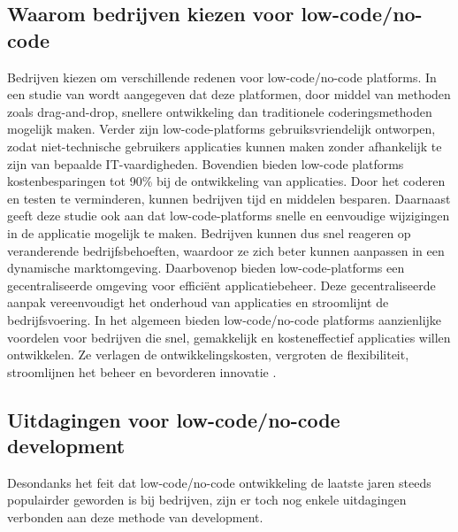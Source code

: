 \subsection{Waarom bedrijven kiezen voor low-code/no-code}
\label{subsec:waarom_low-code}

Bedrijven kiezen om verschillende redenen voor low-code/no-code platforms. In een studie van \textcite{Yan2021} wordt aangegeven dat deze platformen, door middel van methoden zoals drag-and-drop, snellere ontwikkeling dan traditionele coderingsmethoden mogelijk maken. Verder zijn low-code-platforms gebruiksvriendelijk ontworpen, zodat niet-technische gebruikers applicaties kunnen maken zonder afhankelijk te zijn van bepaalde IT-vaardigheden. Bovendien bieden low-code platforms kostenbesparingen tot 90\% bij de ontwikkeling van applicaties. Door het coderen en testen te verminderen, kunnen bedrijven tijd en middelen besparen. Daarnaast geeft deze studie ook aan dat low-code-platforms snelle en eenvoudige wijzigingen in de applicatie mogelijk te maken. Bedrijven kunnen dus snel reageren op veranderende bedrijfsbehoeften, waardoor ze zich beter kunnen aanpassen in een dynamische marktomgeving. Daarbovenop bieden low-code-platforms een gecentraliseerde omgeving voor efficiënt applicatiebeheer. Deze gecentraliseerde aanpak vereenvoudigt het onderhoud van applicaties en stroomlijnt de bedrijfsvoering. In het algemeen bieden low-code/no-code platforms aanzienlijke voordelen voor bedrijven die snel, gemakkelijk en kosteneffectief applicaties willen ontwikkelen. Ze verlagen de ontwikkelingskosten, vergroten de flexibiliteit, stroomlijnen het beheer en bevorderen innovatie \autocite{Yan2021}.

\subsection{Uitdagingen voor low-code/no-code development}
\label{subsec:uitdagingen_low_code}

Desondanks het feit dat low-code/no-code ontwikkeling de laatste jaren steeds populairder geworden is bij bedrijven, zijn er toch nog enkele uitdagingen verbonden aan deze methode van development. \\

